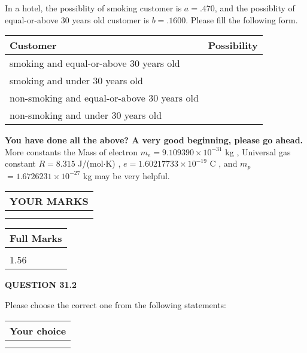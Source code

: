 \documentclass[12pt]{article}
\begin{document}
  
In a hotel, the possiblity of  %
smoking customer is
$a =  %
.470$, and the possiblity of  %
equal-or-above 30 years old customer is $ b =  %
.1600$.
Please fill the following form.
 
\noindent
\begin{tabular}{|l|l|}
\hline
Customer & Possibility \\
\hline
smoking  and   %
equal-or-above 30 years old  & \\
\hline
smoking  and   %
under 30 years old & \\
\hline
 non-smoking and   %
equal-or-above 30 years old  & \\
\hline
 non-smoking and  %
under 30 years old & \\
\hline
\end{tabular}
 
 
 

 

 
\vspace{0.3in}
   
   
\vspace{0.3in}
{\textbf{\LARGE{You have done all the above? A very good beginning, please go ahead.}}}
More constants the
Mass of electron
$m_e$$ =
9.109390 \times 10^{-31} $
kg
,
Universal gas constant
$R$$ =
8.315 $
J/(mol$\cdot $K)
,
$e$$ =
1.60217733 \times 10^{-19} $
C
, and
$m_p$$ =
1.6726231 \times 10^{-27} $
kg
%
may be very helpful.
\vspace{0.3in}
   
   
  
\vspace{0.2in}
  
\noindent\begin{tabular}{|l|}
\hline
 YOUR MARKS  \\
\hline
 \\ 
 \\ 
\hline
\end{tabular}
\hspace{0.05in} \begin{tabular}{|l|}
\hline
 Full Marks  \\
\hline
 \\ 
1.56 \\
\hline
\end{tabular}
{\textbf{\Large{QUESTION
31.2 
}}}
  
  
Please choose the correct one from the following statements:
  
  
\noindent\hspace{3.0in} \begin{tabular}{|l|}
\hline
Your choice \\
\hline
 \\ 
 \\ 
\hline
\end{tabular}
  
\end{document}
